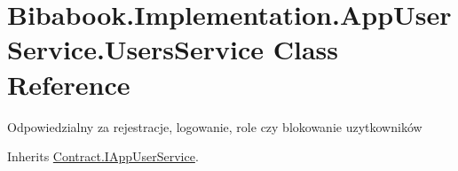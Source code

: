 \hypertarget{class_bibabook_1_1_implementation_1_1_app_user_service_1_1_users_service}{}\section{Bibabook.\+Implementation.\+App\+User\+Service.\+Users\+Service Class Reference}
\label{class_bibabook_1_1_implementation_1_1_app_user_service_1_1_users_service}


Odpowiedzialny za rejestracje, logowanie, role czy blokowanie uzytkowników  




Inherits \hyperlink{interface_contract_1_1_i_app_user_service}{Contract.\+I\+App\+User\+Service}.

